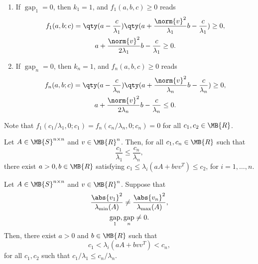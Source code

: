 \documentclass[nobib]{my-handout}
\DeclareMathOperator{\gap}{gap}
\begin{document}
\begin{remark}
	\begin{enumerate}
		\item If $\gap_1 = 0$, then $k_1 = 1$, and $f_1(a, b, c) \ge 0$ reads
			\begin{gather*}
				f_1(a, b; c) = \qty(a - \frac{c}{\lambda_1}) \qty(a +
				\frac{\norm{v}^2}{\lambda_1} b - \frac{c}{\lambda_1}) \ge 0, \\
				a + \frac{\norm{v}^2}{2 \lambda_1} b - \frac{c}{\lambda_1} \ge 0.
			\end{gather*}
		\item If $\gap_n = 0$, then $k_n = 1$, and $f_n(a, b, c) \ge 0$ reads
			\begin{gather*}
				f_n(a, b; c) = \qty(a - \frac{c}{\lambda_n}) \qty(a +
				\frac{\norm{v}^2}{\lambda_n} b - \frac{c}{\lambda_n}) \ge 0, \\
				a + \frac{\norm{v}^2}{2 \lambda_n} b - \frac{c}{\lambda_n} \le 0.
			\end{gather*}
	\end{enumerate}
\end{remark}

\begin{remark}
	Note that $f_1(c_1/\lambda_1, 0; c_1) = f_n(c_n/\lambda_n, 0; c_n) = 0$ for
	all $c_1, c_2 \in \MB{R}$.
\end{remark}

\begin{lemma}
	Let $A \in \MB{S}^{n \times n}$ and $v \in \MB{R}^n$. Then, for all $c_1, c_n
	\in \MB{R}$ such that
	\begin{equation*}
		\frac{c_1}{\lambda_1} \le \frac{c_n}{\lambda_n},
	\end{equation*}
	there exist $a>0, b \in \MB{R}$ satisfying $c_1 \le \lambda_i(a A + b v v^T)
	\le c_2$, for $i = 1, \dotsc, n$.
\end{lemma}

\begin{theorem}
	Let $A \in \MB{S}^{n \times n}$ and $v \in \MB{R}^n$. Suppose that 
	\begin{gather}
		\frac{\abs{v_1}^2}{\lambda_{\min}(A)} \ne
		\frac{\abs{v_n}^2}{\lambda_{\max}(A)}, \\
		\gap_1, \gap_n \ne 0.
	\end{gather}
	Then, there exist $a > 0$ and $b \in \MB{R}$ such that
	\begin{equation*}
		c_1 < \lambda_i(a A + b v v^T) < c_n,
	\end{equation*}
	for all $c_1, c_2$ such that $c_1/\lambda_1 \le c_n/\lambda_n$.
\end{theorem}
\end{document}
